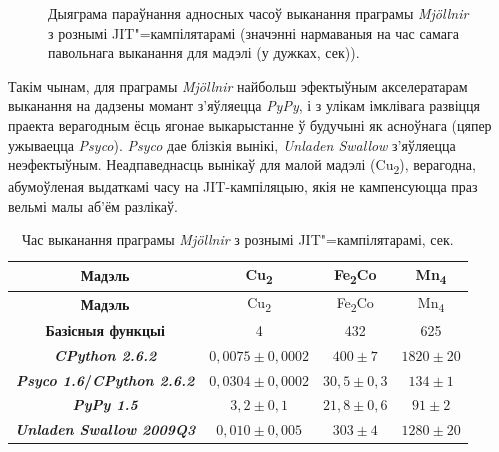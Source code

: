 \documentclass[a4paper,12pt]{article}
\newcommand{\progname}{\textit} %
\begin{document}
\begin{figure}[ht]
\caption{Дыяграма параўнання адносных часоў выканання праграмы \progname{Mj{\"o}llnir} з рознымі JIT"=кампілятарамі (значэнні нармаваныя на час самага павольнага выканання для мадэлі (у дужках, сек)).}
\label{pic:benchmark}
\end{figure}

Такім чынам, для праграмы \progname{Mj{\"o}llnir} найбольш эфектыўным акселератарам выканання на дадзены момант з'яўляецца \progname{PyPy}, і з улікам імклівага развіцця праекта верагодным ёсць ягонае выкарыстанне ў будучыні як асноўнага (цяпер ужываецца \progname{Psyco}). \progname{Psyco} дае блізкія вынікі, \progname{Unladen Swallow} з'яўляецца неэфектыўным. Неадпаведнасць вынікаў для малой мадэлі (Cu\textsubscript{2}), верагодна, абумоўленая выдаткамі часу на JIT-кампіляцыю, якія не кампенсуюцца праз вельмі малы аб'ём разлікаў.

\begin{longtable}{|>{\bfseries}c|c|c|c|}
\caption{Час выканання праграмы \progname{Mj{\"o}llnir} з рознымі JIT"=кампілятарамі, сек.}\label{tab:benchmark}\\
\hline
Мадэль&Cu\textsubscript{2}&Fe\textsubscript{2}Co&Mn\textsubscript{4}\\
\hline\endfirsthead
\hline
Мадэль&Cu\textsubscript{2}&Fe\textsubscript{2}Co&Mn\textsubscript{4}\\
\hline\endhead
Базісныя функцыі&4&432&625\\
\hline
\progname{CPython 2.6.2}&$0,0075 \pm 0,0002$&$400 \pm 7$&$1820 \pm 20$\\
\hline
\progname{Psyco 1.6}/\progname{CPython 2.6.2}&$0,0304 \pm 0,0002$&$30,5 \pm 0,3$&$134 \pm 1$\\
\hline
\progname{PyPy 1.5} &$3,2 \pm 0,1$&$21,8 \pm 0,6$&$91 \pm 2$\\
\hline
\progname{Unladen Swallow 2009Q3}&$0,010 \pm 0,005$&$303 \pm 4$&$1280 \pm 20$\\
\hline
\end{longtable}
\end{document}
